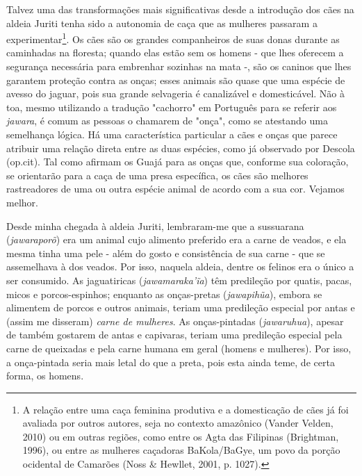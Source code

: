 Talvez uma das transformações mais significativas desde a introdução dos
cães na aldeia Juriti tenha sido a autonomia de caça que as mulheres
passaram a experimentar\footnote{A relação entre uma caça feminina
  produtiva e a domesticação de cães já foi avaliada por outros autores,
  seja no contexto amazônico (Vander Velden, 2010) ou em outras regiões,
  como entre os Agta das Filipinas (Brightman, 1996), ou entre as
  mulheres caçadoras BaKola/BaGye, um povo da porção ocidental de
  Camarões (Noss \& Hewllet, 2001, p. 1027).}. Os cães são os grandes
companheiros de suas donas durante as caminhadas na floresta; quando
elas estão sem os homens - que lhes oferecem a segurança necessária para
embrenhar sozinhas na mata -, são os caninos que lhes garantem proteção
contra as onças; esses animais são quase que uma espécie de avesso do
jaguar, pois sua grande selvageria é canalizável e domesticável. Não à
toa, mesmo utilizando a tradução "cachorro" em Português para se referir
aos \emph{jawara}, é comum as pessoas o chamarem de "onça", como se
atestando uma semelhança lógica. Há uma característica particular a cães
e onças que parece atribuir uma relação direta entre as duas espécies,
como já observado por Descola (op.cit). Tal como afirmam os Guajá para
as onças que, conforme sua coloração, se orientarão para a caça de uma
presa específica, os cães são melhores rastreadores de uma ou outra
espécie animal de acordo com a sua cor. Vejamos melhor.

Desde minha chegada à aldeia Juriti, lembraram-me que a sussuarana
(\emph{jawaraporõ}) era um animal cujo alimento preferido era a carne de
veados, e ela mesma tinha uma pele - além do gosto e consistência de sua
carne - que se assemelhava à dos veados. Por isso, naquela aldeia,
dentre os felinos era o único a ser consumido. As jaguatiricas
(\emph{jawamaraka'ĩa}) têm predileção por quatis, pacas, micos e
porcos-espinhos; enquanto as onças-pretas (\emph{jawapihũa}), embora se
alimentem de porcos e outros animais, teriam uma predileção especial por
antas e (assim me disseram) \emph{carne de mulheres}. As onças-pintadas
(\emph{jawaruhua}), apesar de também gostarem de antas e capivaras,
teriam uma predileção especial pela carne de queixadas e pela carne
humana em geral (homens e mulheres). Por isso, a onça-pintada seria mais
letal do que a preta, pois esta ainda teme, de certa forma, os homens.

